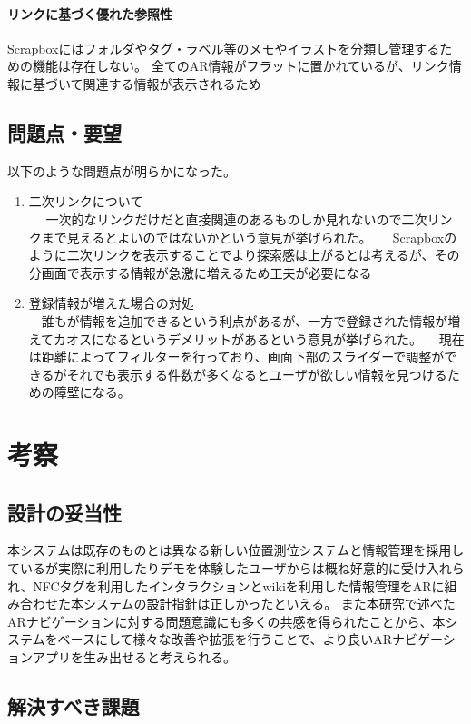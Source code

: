 \paragraph*{リンクに基づく優れた参照性}
Scrapboxにはフォルダやタグ・ラベル等のメモやイラストを分類し管理するための機能は存在しない。
全てのAR情報がフラットに置かれているが、リンク情報に基づいて関連する情報が表示されるため



\subsection{問題点・要望}
以下のような問題点が明らかになった。
\begin{enumerate}
  \item 二次リンクについて\\
　 一次的なリンクだけだと直接関連のあるものしか見れないので二次リンクまで見えるとよいのではないかという意見が挙げられた。
　 Scrapboxのように二次リンクを表示することでより探索感は上がるとは考えるが、その分画面で表示する情報が急激に増えるため工夫が必要になる
  \item 登録情報が増えた場合の対処\\
 　誰もが情報を追加できるという利点があるが、一方で登録された情報が増えてカオスになるというデメリットがあるという意見が挙げられた。
 　現在は距離によってフィルターを行っており、画面下部のスライダーで調整ができるがそれでも表示する件数が多くなるとユーザが欲しい情報を見つけるための障壁になる。
\end{enumerate}


\section{考察}

\subsection{設計の妥当性}
本システムは既存のものとは異なる新しい位置測位システムと情報管理を採用しているが実際に利用したりデモを体験したユーザからは概ね好意的に受け入れられ、NFCタグを利用したインタラクションとwikiを利用した情報管理をARに組み合わせた本システムの設計指針は正しかったといえる。
また本研究で述べたARナビゲーションに対する問題意識にも多くの共感を得られたことから、本システムをベースにして様々な改善や拡張を行うことで、より良いARナビゲーションアプリを生み出せると考えられる。

\subsection{解決すべき課題}


